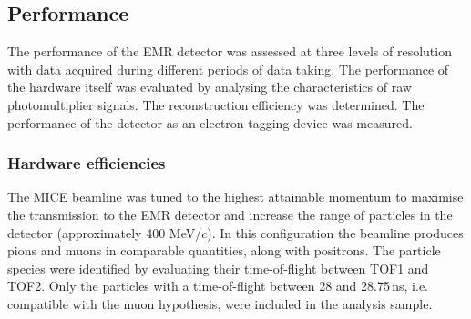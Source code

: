 \subsection{Performance}
\label{SubSect:EMR_Performance}

The performance of the EMR detector was assessed at three levels of resolution with data acquired during different periods of data taking.
The performance of the hardware itself was evaluated by analysing the characteristics of raw photomultiplier signals. The reconstruction efficiency was determined. The performance of the detector as an electron tagging device was measured.

\subsubsection{Hardware efficiencies}
The MICE beamline was tuned to the highest attainable momentum to maximise the transmission to the EMR detector and increase the range of particles in the detector (approximately 400 MeV/$c$). In this configuration the beamline produces pions and muons in comparable quantities, along with positrons. The particle species were identified by evaluating their time-of-flight between TOF1 and TOF2.
Only the particles with a time-of-flight between 28 and 28.75\,ns, i.e. compatible with the muon hypothesis, were included in the analysis sample.


